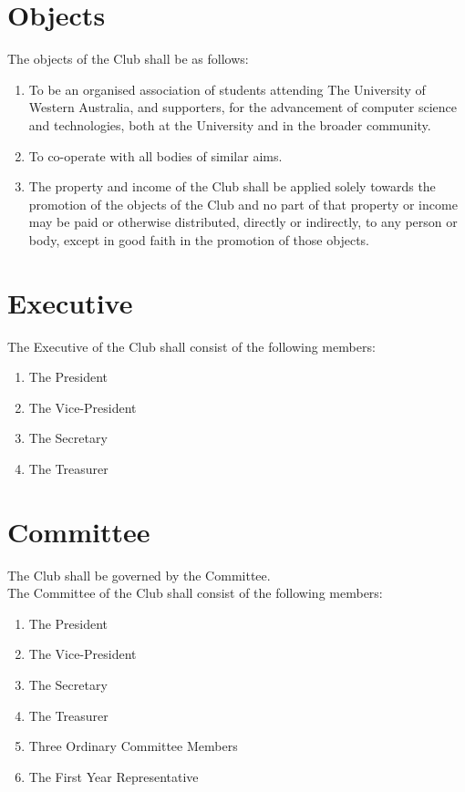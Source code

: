 \documentclass[11pt]{article} %
\begin{document}
\section{Objects}
The objects of the Club shall be as follows:
\begin{enumerate}
	\item To be an organised association of students attending The University of Western Australia, and supporters, for the advancement of computer science and technologies, both at the University and in the broader community.
	\item To co-operate with all bodies of similar aims.
	\item The property and income of the Club shall be applied solely towards the promotion of the objects of the Club and no part of that property or income may be paid or otherwise distributed, directly or indirectly, to any person or body, except in good faith in the promotion of those objects.
\end{enumerate}

\section{Executive}
The Executive of the Club shall consist of the following members:
\begin{enumerate}
	\item The President
	\item The Vice-President
	\item The Secretary
	\item The Treasurer
\end{enumerate}

\section{Committee}
The Club shall be governed by the Committee.\\
The Committee of the Club shall consist of the following members:
\begin{enumerate}
	\item The President
	\item The Vice-President
	\item The Secretary
	\item The Treasurer
	\item Three Ordinary Committee Members
	\item The First Year Representative
\end{enumerate}
\end{document}
